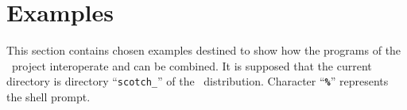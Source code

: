 
\section{Examples}
\label{sec-examples}

This section contains chosen examples destined to show how the programs
of the \scotch\ project interoperate and can be combined.
It is supposed that the current directory is directory
``\texttt{scotch\_\scotchver}'' of the \scotch\ distribution.
Character ``{\tt\bf \%}'' represents the shell prompt.
